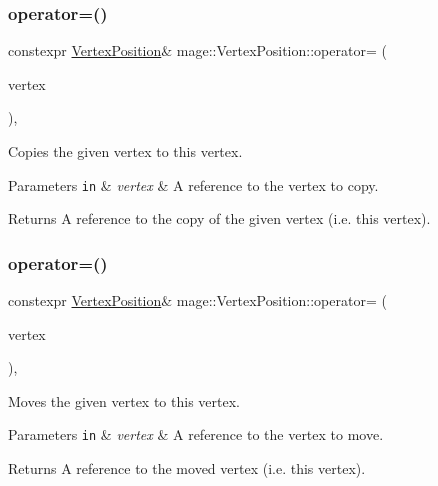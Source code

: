 \subsubsection{\texorpdfstring{operator=()}{operator=()}\hspace{0.1cm}{\footnotesize\ttfamily [1/2]}}
{\footnotesize\ttfamily constexpr \hyperlink{structmage_1_1_vertex_position}{Vertex\+Position}\& mage\+::\+Vertex\+Position\+::operator= (\begin{DoxyParamCaption}\item[{const \hyperlink{structmage_1_1_vertex_position}{Vertex\+Position} \&}]{vertex }\end{DoxyParamCaption})\hspace{0.3cm}{\ttfamily [default]}, {\ttfamily [noexcept]}}

Copies the given vertex to this vertex.


\begin{DoxyParams}[1]{Parameters}
\mbox{\tt in}  & {\em vertex} & A reference to the vertex to copy. \\
\hline
\end{DoxyParams}
\begin{DoxyReturn}{Returns}
A reference to the copy of the given vertex (i.\+e. this vertex). 
\end{DoxyReturn}
\hypertarget{structmage_1_1_vertex_position_af0ff6c62f29e2170e93fb50cfe713c3a}{}\label{structmage_1_1_vertex_position_af0ff6c62f29e2170e93fb50cfe713c3a} 
\subsubsection{\texorpdfstring{operator=()}{operator=()}\hspace{0.1cm}{\footnotesize\ttfamily [2/2]}}
{\footnotesize\ttfamily constexpr \hyperlink{structmage_1_1_vertex_position}{Vertex\+Position}\& mage\+::\+Vertex\+Position\+::operator= (\begin{DoxyParamCaption}\item[{\hyperlink{structmage_1_1_vertex_position}{Vertex\+Position} \&\&}]{vertex }\end{DoxyParamCaption})\hspace{0.3cm}{\ttfamily [default]}, {\ttfamily [noexcept]}}

Moves the given vertex to this vertex.


\begin{DoxyParams}[1]{Parameters}
\mbox{\tt in}  & {\em vertex} & A reference to the vertex to move. \\
\hline
\end{DoxyParams}
\begin{DoxyReturn}{Returns}
A reference to the moved vertex (i.\+e. this vertex). 
\end{DoxyReturn}


